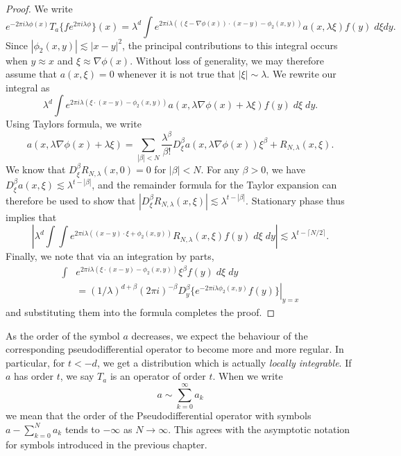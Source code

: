 \begin{proof}
    We write
    \[ e^{-2 \pi i \lambda \phi(x)} T_a \{ f e^{2 \pi i \lambda \phi } \}(x) = \lambda^d \int e^{2 \pi i \lambda ( (\xi - \nabla \phi(x)) \cdot (x - y) - \phi_2(x,y))} a(x, \lambda \xi) f(y)\; d\xi dy. \]
    Since $|\phi_2(x,y)| \lesssim |x - y|^2$, the principal contributions to this integral occurs when $y \approx x$ and $\xi \approx \nabla \phi(x)$. Without loss of generality, we may therefore assume that $a(x,\xi) = 0$ whenever it is not true that $|\xi| \sim \lambda$. We rewrite our integral as
    \[ \lambda^d \int e^{2 \pi i \lambda ( \xi \cdot (x - y) - \phi_2(x,y) )} a(x, \lambda \nabla \phi(x) + \lambda \xi) f(y)\; d\xi\; dy. \]
    Using Taylors formula, we write
    \[ a(x, \lambda \nabla \phi(x) + \lambda \xi) = \sum_{|\beta| < N} \frac{\lambda^\beta}{\beta !} D_\xi^\beta a(x, \lambda \nabla \phi(x)) \xi^\beta + R_{N,\lambda}(x,\xi). \]
    We know that $D_\xi^\beta R_{N,\lambda}(x,0) = 0$ for $|\beta| < N$. For any $\beta > 0$, we have $D_\xi^\beta a(x,\xi) \lesssim \lambda^{t - |\beta|}$, and the remainder formula for the Taylor expansion can therefore be used to show that $|D_\xi^\beta R_{N,\lambda}(x,\xi)| \lesssim \lambda^{t - |\beta|}$. Stationary phase thus implies that
    \[ \left| \lambda^d \int \int e^{2 \pi i \lambda ((x - y) \cdot \xi + \phi_2(x,y))} R_{N,\lambda}(x,\xi) f(y)\; d\xi\; dy \right| \lesssim \lambda^{t - \lceil N/2 \rceil}. \]
    Finally, we note that via an integration by parts,
    \begin{align*}
        \int & e^{2 \pi i \lambda (\xi \cdot (x - y) - \phi_2(x,y))} \xi^\beta f(y)\; d\xi\; dy\\
        &= (1/\lambda)^{d + \beta} (2 \pi i)^{-\beta} \left. D_y^\beta \{ e^{- 2 \pi i \lambda \phi_2(x,y)} f(y) \} \right|_{y = x}
    \end{align*}
    and substituting them into the formula completes the proof.
\end{proof}

As the order of the symbol $a$ decreases, we expect the behaviour of the corresponding pseudodifferential operator to become more and more regular. In particular, for $t < - d$, we get a distribution which is actually \emph{locally integrable}. If $a$ has order $t$, we say $T_a$ is an operator of order $t$. When we write
%
\[ a \sim \sum_{k = 0}^\infty a_k \]
%
we mean that the order of the Pseudodifferential operator with symbols $a - \sum_{k = 0}^N a_k$ tends to $-\infty$ as $N \to \infty$. This agrees with the asymptotic notation for symbols introduced in the previous chapter.

